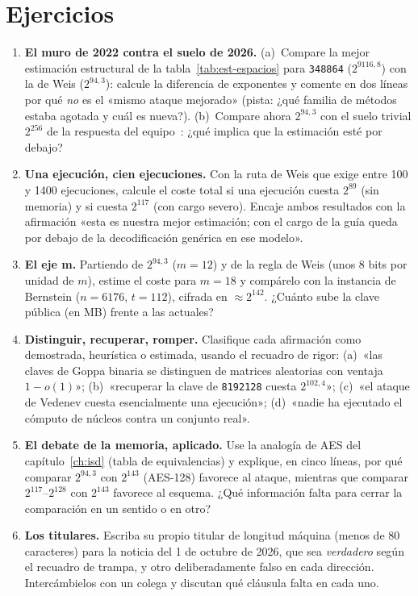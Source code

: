 \documentclass[11pt,a4paper,oneside]{report}
\begin{document}
\section{Ejercicios}

\begin{enumerate}[leftmargin=1.6em,itemsep=4pt]
  \item \textbf{El muro de 2022 contra el suelo de 2026.}
        (a)~Compare la mejor estimación estructural de la
        tabla~\ref{tab:est-espacios} para \texttt{348864}
        ($2^{9116{,}8}$) con la de Weis ($2^{94{,}3}$): calcule la
        diferencia de exponentes y comente en dos líneas por qué
        \emph{no} es el «mismo ataque mejorado» (pista: ¿qué
        familia de métodos estaba agotada y cuál es nueva?).
        (b)~Compare ahora $2^{94{,}3}$ con el suelo trivial $2^{256}$
        de la respuesta del equipo~\cite{cm529}: ¿qué implica que
        la estimación esté por debajo?
  \item \textbf{Una ejecución, cien ejecuciones.} Con la ruta de
        Weis que exige entre 100 y 1400 ejecuciones, calcule el
        coste total si una ejecución cuesta $2^{89}$ (sin memoria)
        y si cuesta $2^{117}$ (con cargo severo). Encaje ambos
        resultados con la afirmación «esta es nuestra mejor
        estimación; con el cargo de la guía queda por debajo de la
        decodificación genérica en ese modelo».
  \item \textbf{El eje m.} Partiendo de $2^{94{,}3}$ ($m=12$) y de
        la regla de Weis (unos 8 bits por unidad de $m$), estime el
        coste para $m=18$ y compárelo con la instancia de Bernstein
        ($n=6176$, $t=112$), cifrada en $\approx 2^{142}$.
        ¿Cuánto sube la clave pública (en MB) frente a las actuales?
  \item \textbf{Distinguir, recuperar, romper.} Clasifique cada
        afirmación como demostrada, heurística o estimada, usando
        el recuadro de rigor: (a)~«las claves de Goppa binaria se
        distinguen de matrices aleatorias con ventaja
        $1-o(1)$»; (b)~«recuperar la clave de \texttt{8192128}
        cuesta $2^{102{,}4}$»; (c)~«el ataque de Vedenev cuesta
        esencialmente una ejecución»; (d)~«nadie ha ejecutado el
        cómputo de núcleos contra un conjunto real».
  \item \textbf{El debate de la memoria, aplicado.} Use la
        analogía de AES del capítulo~\ref{ch:isd} (tabla de
        equivalencias) y explique, en cinco líneas, por qué
        comparar $2^{94{,}3}$ con $2^{143}$ (AES-128) favorece al
        ataque, mientras que comparar $2^{117}$--$2^{128}$ con
        $2^{143}$ favorece al esquema. ¿Qué información falta para
        cerrar la comparación en un sentido o en otro?
  \item \textbf{Los titulares.} Escriba su propio titular de
        longitud máquina (menos de 80 caracteres) para la noticia
        del 1 de octubre de 2026, que sea \emph{verdadero} según el
        recuadro de trampa, y otro deliberadamente falso en cada
        dirección. Intercámbielos con un colega y discutan qué
        cláusula falta en cada uno.
\end{enumerate}
\end{document}
